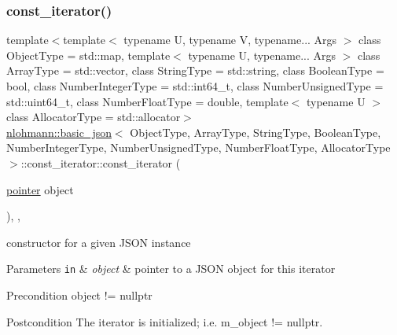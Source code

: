 \subsubsection{\texorpdfstring{const\+\_\+iterator()}{const\_iterator()}\hspace{0.1cm}{\footnotesize\ttfamily [1/3]}}
{\footnotesize\ttfamily template$<$template$<$ typename U, typename V, typename... Args $>$ class Object\+Type = std\+::map, template$<$ typename U, typename... Args $>$ class Array\+Type = std\+::vector, class String\+Type  = std\+::string, class Boolean\+Type  = bool, class Number\+Integer\+Type  = std\+::int64\+\_\+t, class Number\+Unsigned\+Type  = std\+::uint64\+\_\+t, class Number\+Float\+Type  = double, template$<$ typename U $>$ class Allocator\+Type = std\+::allocator$>$ \\
\hyperlink{classnlohmann_1_1basic__json}{nlohmann\+::basic\+\_\+json}$<$ Object\+Type, Array\+Type, String\+Type, Boolean\+Type, Number\+Integer\+Type, Number\+Unsigned\+Type, Number\+Float\+Type, Allocator\+Type $>$\+::const\+\_\+iterator\+::const\+\_\+iterator (\begin{DoxyParamCaption}\item[{\hyperlink{classnlohmann_1_1basic__json_1_1const__iterator_a1da96fc3054d547e7706d3a2f073f389}{pointer}}]{object }\end{DoxyParamCaption})\hspace{0.3cm}{\ttfamily [inline]}, {\ttfamily [explicit]}, {\ttfamily [noexcept]}}



constructor for a given J\+S\+ON instance 


\begin{DoxyParams}[1]{Parameters}
\mbox{\tt in}  & {\em object} & pointer to a J\+S\+ON object for this iterator \\
\hline
\end{DoxyParams}
\begin{DoxyPrecond}{Precondition}
object != nullptr 
\end{DoxyPrecond}
\begin{DoxyPostcond}{Postcondition}
The iterator is initialized; i.\+e. {\ttfamily m\+\_\+object != nullptr}. 
\end{DoxyPostcond}
\hypertarget{classnlohmann_1_1basic__json_1_1const__iterator_a6b950c6bc081ac1ec1540ec05ceb2603}{}\label{classnlohmann_1_1basic__json_1_1const__iterator_a6b950c6bc081ac1ec1540ec05ceb2603} 
